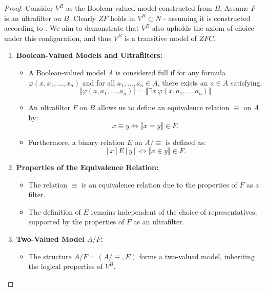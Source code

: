 \begin{proof}
Consider \( V^B \) as the Boolean-valued model constructed from \( B \). Assume \( F \) is an ultrafilter on \( B \). Clearly $ZF$ holds in $V^B \subset N$ - assuming it is constructed according to \cite{jech2003set}. We aim to demonstrate that \( V^B \) also upholds the axiom of choice under this configuration, and thus $V^B$ is a transitive model of $ZFC$.

\begin{enumerate}
    \item \textbf{Boolean-Valued Models and Ultrafilters:}
    \begin{itemize}
        \item A Boolean-valued model \( A \) is considered full if for any formula \( \varphi(x, x_1, \ldots, x_n) \) and for all \( a_1, \ldots, a_n \in A \), there exists an \( a \in A \) satisfying:
        \[
        \llbracket \varphi(a, a_1, \ldots, a_n) \rrbracket = \llbracket \exists x \, \varphi(x, a_1, \ldots, a_n) \rrbracket
        \]
        \item An ultrafilter \( F \) on \( B \) allows us to define an equivalence relation \( \equiv \) on \( A \) by:
        \[
        x \equiv y \iff \llbracket x = y \rrbracket \in F.
        \]
        \item Furthermore, a binary relation \( E \) on \( A/\equiv \) is defined as:
        \[
        [x] E [y] \iff \llbracket x \in y \rrbracket \in F.
        \]
    \end{itemize}

    \item \textbf{Properties of the Equivalence Relation:}
    \begin{itemize}
        \item The relation \( \equiv \) is an equivalence relation due to the properties of \( F \) as a filter.
        \item The definition of \( E \) remains independent of the choice of representatives, supported by the properties of \( F \) as an ultrafilter.
    \end{itemize}

    \item \textbf{Two-Valued Model \( A/F \):}
    \begin{itemize}
        \item The structure \( A/F = (A/\equiv, E) \) forms a two-valued model, inheriting the logical properties of \( V^B \).
    \end{itemize}


\end{enumerate}
\end{proof}
